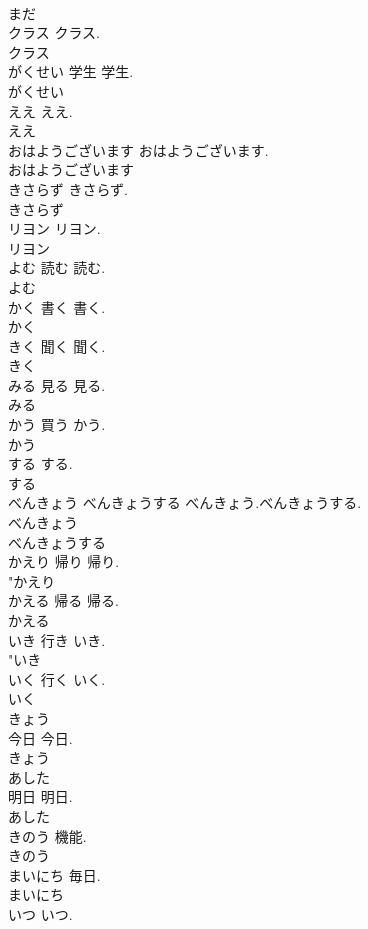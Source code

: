 \documentclass[8pt]{extreport}
\begin{document}
\begin{CJK}{UTF8}{min}
\\	まだ
\\	クラス		クラス.	
\\	クラス
\\	がくせい	学生	学生.	
\\	がくせい
\\	ええ		ええ.	
\\	ええ
\\	おはようございます		おはようございます.	
\\	おはようございます
\\	きさらず		きさらず.	
\\	きさらず
\\	リヨン		リヨン.	
\\	リヨン
\\	よむ	読む	読む.	
\\	よむ
\\	かく	書く	書く.	
\\	かく
\\	きく	聞く	聞く.	
\\	きく
\\	みる	見る	見る.	
\\	みる
\\	かう	買う	かう.	
\\	かう
\\	する		する.	
\\	する
\\	べんきょう べんきょうする		べんきょう.べんきょうする.	
\\	べんきょう
\\	べんきょうする
\\	かえり	帰り	帰り.	
\\	"かえり
\\	かえる	帰る	帰る.	
\\	かえる
\\	いき	行き	いき.	
\\	"いき
\\	いく	行く	いく.	
\\	いく
\\	きょう	
\\	今日	今日.	
\\	きょう
\\	あした	
\\	明日	明日.	
\\	あした
\\	きのう		機能.	
\\	きのう
\\	まいにち		毎日.	
\\	まいにち
\\	いつ		いつ.	

\end{CJK}
\end{document}
